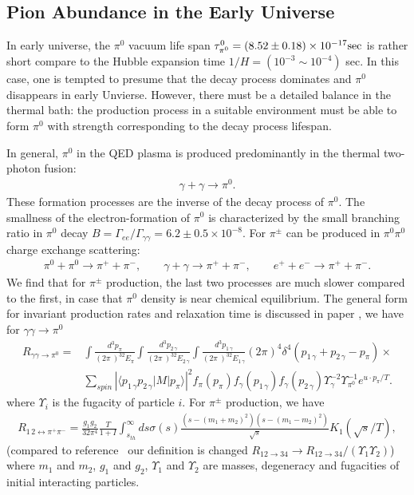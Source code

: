 \documentclass[universe,article,submit,moreauthors,pdftex,a4paper]{Definitions/mdpi}
\begin{document}
\subsection{Pion Abundance in the Early Universe}\label{sec:Pions}
\noindent 
In early universe, the $\pi^0$ vacuum life span $\tau_{\pi^0}^0=(8.52\pm0.18)\times10^{-17} {\rm sec}$ is rather short compare to the Hubble expansion time $1/H=(10^{-3}\sim10^{-4})$ sec. In this case, one is tempted to presume that the decay process dominates and $\pi^0$ disappears in early Unvierse. However, there must be a detailed balance in the thermal bath: the production process in a suitable environment must be able to form $\pi^0$ with strength corresponding to the decay process lifespan. 

In general, $\pi^0$ in the QED plasma is produced predominantly in the thermal two-photon fusion:
\begin{align}
\gamma+\gamma \rightarrow \pi^{0}. 
\end{align}
These formation processes are the inverse of the decay process of $\pi^0$. The smallness of the electron-formation of $\pi^0$ is characterized by the small  branching ratio in $\pi^0$ decay $B=\Gamma_{ee}/\Gamma_{\gamma\gamma}=6.2\pm 0.5\times10^{-8}$.
For $\pi^{\pm}$ can be produced in $\pi^0\pi^0$ charge exchange scattering:
\begin{align}
\pi^0 + \pi^0 \rightarrow \pi^{+} + \pi^{-}, \qquad\gamma+\gamma \rightarrow \pi^{+} + \pi^{-}, \qquad
e^+ + e^- \rightarrow \pi^{+} + \pi^{-}. 
\end{align}
We find  that for $\pi^{\pm}$ production, the last two processes are much slower compared to the first, in case that $\pi^0$ density is near chemical equilibrium. The general form for invariant production rates and relaxation time is discussed in paper \cite{Kuznetsova:2008jt}, we have for $\gamma\gamma\to\pi^0$
\begin{align}
R_{\gamma\gamma\to\pi^0}=&\int\frac{d^{3}{p_{\pi}}}{(2\pi\ )^32E_{\pi}}
   \int\frac{d^{3} {p_{2\,\gamma}}}{(2\pi\ )^32E_{2\,\gamma}}
   \int\frac{d^{3}{p_{1\,\gamma}}} {(2\pi\ )^32E_{1\,\gamma} }\left(2\pi\right)^{4}
 \delta^{4}\left(p_{1\,\gamma}+p_{2\,\gamma}-p_{\pi}\right)\times \nonumber\\ &
  \sum_{spin}\left|\langle p_{1\,\gamma}p_{2\,\gamma}\left| M\right|p_{\pi}\rangle\right|^{2}
   f_{\pi}(p_{\pi})f_{\gamma}(p_{1\,\gamma})f_{\gamma}(p_{2\,\gamma})
 \Upsilon^{-2}_{\gamma}\Upsilon_{\pi^{0}}^{-1}e^{u \cdot p_{\pi}/T}. \label{pi0pr}
 \end{align}
where $\Upsilon_i$ is the fugacity of particle $i$. For $\pi^\pm$ production, we have
\begin{align}
{R_{1\,2 \leftrightarrow \pi^+\pi^-}} = \frac{g_1g_2}{32\pi^4}\frac{T}{1+I}
\int_{s_{th}}^{\infty}ds\sigma(s)\frac{(s-(m_{1}+m_2)^2)(s-(m_1-m_2)^2)}{\sqrt{s}}K_1(\sqrt{s}/T),
\end{align}
(compared to reference~\cite{Letessier:2002ony} our definition is changed 
$R_{12\rightarrow 34} \rightarrow 
R_{12 \rightarrow 34}/(\Upsilon_1 \Upsilon_2)$)
where $m_1$ and $m_2$, $g_1$ and $g_2$, $\Upsilon_1$ and $\Upsilon_2$ are masses, degeneracy and fugacities of initial interacting particles. 
\end{document}
